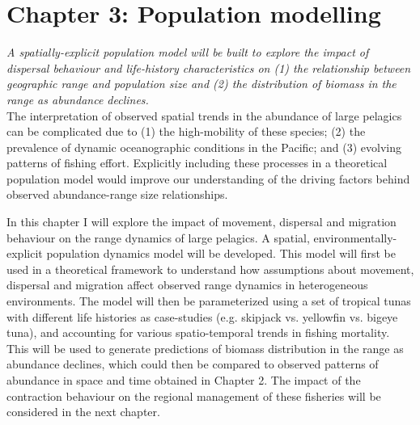 \documentclass{article}
\begin{document}


\newpage
\section*{Chapter 3: Population modelling}
\addtocounter{section}{1}
\setcounter{subsection}{0}

\emph{A spatially-explicit population model will be built to
explore the impact of dispersal behaviour and life-history
characteristics on (1) the
relationship between geographic range and population size and (2) the
distribution of biomass in the range as abundance declines.}\\

The interpretation of observed spatial trends in the abundance of
large pelagics can be complicated due to (1) the high-mobility of
these species; (2) the prevalence of dynamic oceanographic conditions
in the Pacific; and (3) evolving patterns of fishing
effort. Explicitly including these processes in a
theoretical population model would improve our understanding of the
driving factors behind observed abundance-range size relationships.

In this chapter I will explore the impact of movement, dispersal and
migration behaviour on the range dynamics of large
pelagics. A spatial, environmentally-explicit population dynamics model will
be developed. This model will first be used in a theoretical framework
to understand how assumptions about movement, dispersal and migration
affect observed range dynamics in heterogeneous environments. The
model will then be parameterized using a set
of tropical tunas with different life histories as case-studies
(e.g. skipjack vs. yellowfin vs. bigeye tuna), and accounting for various
spatio-temporal trends in fishing mortality. This will be used to generate
 predictions of biomass distribution in the range as abundance
 declines, which could then be compared to observed
patterns of abundance in space and time obtained in Chapter 2. The
impact of the contraction behaviour on the regional management of
these fisheries will be considered in the next chapter.
\end{document}
